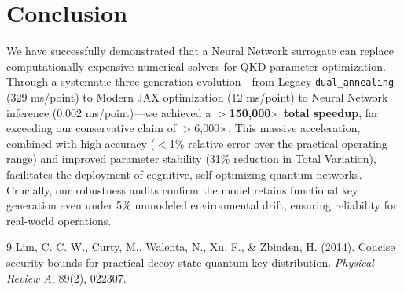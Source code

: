 \documentclass[11pt,a4paper]{article}
\begin{document}
\section{Conclusion}
We have successfully demonstrated that a Neural Network surrogate can replace computationally expensive numerical solvers for QKD parameter optimization. Through a systematic three-generation evolution---from Legacy \texttt{dual\_annealing} (329 ms/point) to Modern JAX optimization (12 ms/point) to Neural Network inference (0.002 ms/point)---we achieved a \textbf{$>$150,000$\times$ total speedup}, far exceeding our conservative claim of $>$6,000$\times$. This massive acceleration, combined with high accuracy ($<$1\% relative error over the practical operating range) and improved parameter stability (31\% reduction in Total Variation), facilitates the deployment of cognitive, self-optimizing quantum networks. Crucially, our robustness audits confirm the model retains functional key generation even under 5\% unmodeled environmental drift, ensuring reliability for real-world operations.

\begin{thebibliography}{9}
Lim, C. C. W., Curty, M., Walenta, N., Xu, F., \& Zbinden, H. (2014). Concise security bounds for practical decoy-state quantum key distribution. \textit{Physical Review A}, 89(2), 022307.
\end{thebibliography}
\end{document}
